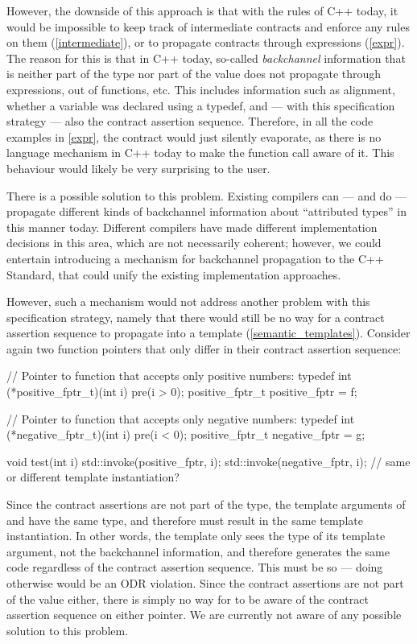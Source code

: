 However, the downside of this approach is that with the rules of C++ today, it would be impossible to keep track of intermediate contracts and enforce any rules on them (\ref{intermediate}), or to propagate contracts through expressions (\ref{expr}). The reason for this is that in C++ today, so-called \emph{backchannel} information that is neither part of the type nor part of the value does not propagate through expressions, out of functions, etc. This includes information such as alignment, whether a variable was declared using a typedef, and --- with this specification strategy --- also the contract assertion sequence. Therefore, in all the code examples in \ref{expr}, the contract would just silently evaporate, as there is no language mechanism in C++ today to make the function call aware of it. This behaviour would likely be very surprising to the user.

There is a possible solution to this problem. Existing compilers can --- and do --- propagate different kinds of backchannel information about ``attributed types'' in this manner today. Different compilers have made different implementation decisions in this area, which are not necessarily coherent; however, we could entertain introducing a mechanism for backchannel propagation to the C++ Standard, that could unify the existing implementation approaches.

However, such a mechanism would not address another problem with this specification strategy, namely that there would still be no way for a contract assertion sequence to propagate into a template (\ref{semantic_templates}). Consider again two function pointers that only differ in their contract assertion sequence:
\begin{codeblock}
// Pointer to function that accepts only positive numbers:
typedef int (*positive_fptr_t)(int i) pre(i > 0);
positive_fptr_t positive_fptr = f;

// Pointer to function that accepts only negative numbers:
typedef int (*negative_fptr_t)(int i) pre(i < 0);
positive_fptr_t negative_fptr = g;

void test(int i) {
  std::invoke(positive_fptr, i);
  std::invoke(negative_fptr, i);  // same or different template instantiation?
}
\end{codeblock}
Since the contract assertions are not part of the type, the template arguments of  and  have the same type, and therefore must result in the same template instantiation. In other words, the template only sees the type of its template argument, not the backchannel information, and therefore generates the same code regardless of the contract assertion sequence. This must be so --- doing otherwise would be an ODR violation. Since the contract assertions are not part of the value either, there is simply no way for  to be aware of the contract assertion sequence on either pointer. We are currently not aware of any possible solution to this problem.

